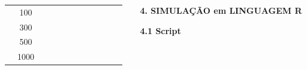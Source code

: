 \documentclass[final]{beamer}
\begin{document}
\begin{frame}[t]
\begin{columns}[t,totalwidth=0.6\paperwidth]
\begin{column}{0.45\paperwidth}
\begin{table}[H]
\begin{tabular}{c|c|c|c|c|c|c|c|c|c|c|c}
               & 100    &       &       &       &      &       &        &       &         &         &        \\
               & 300    &       &       &       &      &       &        &       &         &         &        \\
               & 500    &       &       &       &      &       &        &       &         &         &        \\
               & 1000   &       &       &       &      &       &        &       &         &         &        \\
    \hline \hline
    \end{tabular}
    \label{tab:inverted2}
\end{table}


\vspace{1em}
 \justifying
 
  \end{column}
  \hspace{0.02\paperwidth} 

  \begin{column}{0.45\textwidth}
 
{\large\bfseries 4. SIMULAÇÃO em LINGUAGEM R}\par
\justifying
\vspace{1.3cm}

{\large\bfseries 4.1 Script}\par
\vspace{1.3cm}


\end{column}
\end{columns}
\end{frame}
\end{document}
